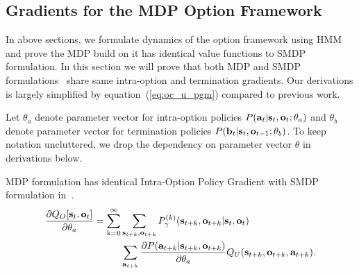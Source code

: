 \subsection{Gradients for the MDP Option Framework}
\label{sec:appen_mdp_grad}

In above sections, we formulate dynamics of the option framework
using HMM and prove the MDP build on it has identical value
functions to SMDP formulation. In this section we will prove that
both MDP and SMDP formulations~\cite{bacon2017option} share same
intra-option and termination gradients. Our derivations is
largely simplified by equation~(\ref{eq:oc_u_pgm}) compared to
previous work.

Let $\theta_a$ denote parameter vector for intra-option policies
$P({\mathbf{a}}_t|{\mathbf{s}}_t,{\mathbf{o}}_t;\theta_a)$ and $\theta_b$ denote
parameter vector for termination policies
$P({\mathbf{b}}_t|{\mathbf{s}}_t,{\mathbf{o}}_{t-1};\theta_b)$. To keep notation
uncluttered, we drop the dependency on parameter vector $\theta$
in derivations below.

\begin{prop}
  \label{approp:oc_a_grad}
  MDP formulation has identical Intra-Option Policy Gradient with
  SMDP formulation in~\cite{bacon2017option}.
  \begin{align}
    \nonumber    \frac{\partial Q_O[ {\mathbf{s}}_t,{\mathbf{o}}_t ]}{\partial \theta_a}=
    \sum_{{\textnormal{k}}=0}^\infty&\sum_{{\mathbf{s}}_{t+k},{\mathbf{o}}_{t+k}}P_\gamma^{(k)}({\mathbf{s}}_{t+k},{\mathbf{o}}_{t+k}|{\mathbf{s}}_t,{\mathbf{o}}_t)\\
    \label{eq:oc_a_grad}    &\sum_{{\mathbf{a}}_{t+k}}\frac{\partial P({\mathbf{a}}_{t+k}|{\mathbf{s}}_{t+k},{\mathbf{o}}_{t+k})}{\partial \theta_a}Q_U({\mathbf{s}}_{t+k},{\mathbf{o}}_{t+k},{\mathbf{a}}_{t+k}).
  \end{align}
\end{prop}

